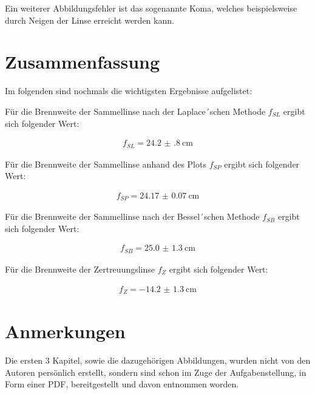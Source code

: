 \documentclass[11pt,ngerman]{scrartcl}
\begin{document}
\vspace{2mm}

Ein weiterer Abbildungsfehler ist das sogenannte Koma, welches beispielsweise
durch Neigen der Linse erreicht werden kann. \cite{demtroder2018ex2}

\newpage

\section{Zusammenfassung}

Im folgenden sind nochmals die wichtigsten Ergebnisse aufgelistet:

\vspace{2mm}

Für die Brennweite der Sammellinse nach der Laplace´schen Methode $f_{SL}$ ergibt sich folgender Wert:

\begin{align*}
	f_{SL} = \SI{24.2(8)}{\cm}
\end{align*}

\vspace{2mm}

Für die Brennweite der Sammellinse anhand des Plots $f_{SP}$ ergibt sich folgender Wert:

\begin{align*}
	f_{SP} = \SI{24.17(7)}{\cm}
\end{align*}

\vspace{2mm}

Für die Brennweite der Sammellinse nach der Bessel´schen Methode $f_{SB}$ ergibt sich folgender Wert:

\begin{align*}
	f_{SB} = \SI{25.0(13)}{\cm}
\end{align*}

\vspace{2mm}

Für die Brennweite der Zertreuungslinse $f_{Z}$ ergibt sich folgender Wert:

\begin{align*}
	f_{Z} = \SI{-14.2(13)}{\cm}
\end{align*}

\vspace{5mm}

\section{Anmerkungen}

Die ersten 3 Kapitel, sowie die dazugehörigen Abbildungen, wurden nicht von den
Autoren persönlich erstellt, sondern sind schon im Zuge der Aufgabenstellung,
in Form einer PDF, bereitgestellt und davon entnommen worden.
\cite{linsenvorlage}


\newpage

\printbibliography
\listoffigures
\listoftables
\end{document}
